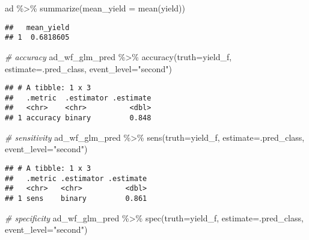 \documentclass[
]{article}
\newenvironment{Shaded}{\begin{snugshade}}{\end{snugshade}}
\newcommand{\AttributeTok}[1]{\textcolor[rgb]{0.77,0.63,0.00}{#1}}
\newcommand{\CommentTok}[1]{\textcolor[rgb]{0.56,0.35,0.01}{\textit{#1}}}
\newcommand{\FunctionTok}[1]{\textcolor[rgb]{0.00,0.00,0.00}{#1}}
\newcommand{\NormalTok}[1]{#1}
\newcommand{\SpecialCharTok}[1]{\textcolor[rgb]{0.00,0.00,0.00}{#1}}
\newcommand{\StringTok}[1]{\textcolor[rgb]{0.31,0.60,0.02}{#1}}
\begin{document}
\begin{Shaded}
\begin{Highlighting}[]
\NormalTok{ad }\SpecialCharTok{\%\textgreater{}\%} 
  \FunctionTok{summarize}\NormalTok{(}\AttributeTok{mean\_yield =} \FunctionTok{mean}\NormalTok{(yield))}
\end{Highlighting}
\end{Shaded}

\begin{verbatim}
##   mean_yield
## 1  0.6818605
\end{verbatim}

\begin{Shaded}
\begin{Highlighting}[]
\CommentTok{\# accuracy}
\NormalTok{ad\_wf\_glm\_pred }\SpecialCharTok{\%\textgreater{}\%}
  \FunctionTok{accuracy}\NormalTok{(}\AttributeTok{truth=}\NormalTok{yield\_f, }\AttributeTok{estimate=}\NormalTok{.pred\_class, }\AttributeTok{event\_level=}\StringTok{"second"}\NormalTok{)}
\end{Highlighting}
\end{Shaded}

\begin{verbatim}
## # A tibble: 1 x 3
##   .metric  .estimator .estimate
##   <chr>    <chr>          <dbl>
## 1 accuracy binary         0.848
\end{verbatim}

\begin{Shaded}
\begin{Highlighting}[]
\CommentTok{\# sensitivity}
\NormalTok{ad\_wf\_glm\_pred }\SpecialCharTok{\%\textgreater{}\%}
  \FunctionTok{sens}\NormalTok{(}\AttributeTok{truth=}\NormalTok{yield\_f, }\AttributeTok{estimate=}\NormalTok{.pred\_class, }\AttributeTok{event\_level=}\StringTok{"second"}\NormalTok{)}
\end{Highlighting}
\end{Shaded}

\begin{verbatim}
## # A tibble: 1 x 3
##   .metric .estimator .estimate
##   <chr>   <chr>          <dbl>
## 1 sens    binary         0.861
\end{verbatim}

\begin{Shaded}
\begin{Highlighting}[]
\CommentTok{\# specificity}
\NormalTok{ad\_wf\_glm\_pred }\SpecialCharTok{\%\textgreater{}\%}
  \FunctionTok{spec}\NormalTok{(}\AttributeTok{truth=}\NormalTok{yield\_f, }\AttributeTok{estimate=}\NormalTok{.pred\_class, }\AttributeTok{event\_level=}\StringTok{"second"}\NormalTok{)}
\end{Highlighting}
\end{Shaded}
\end{document}
